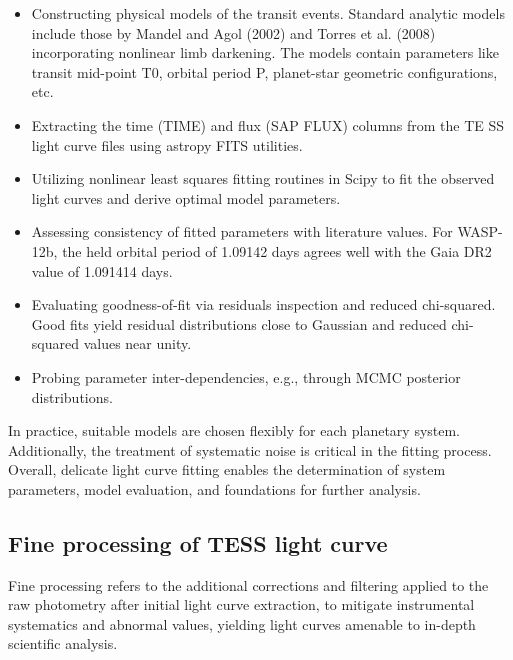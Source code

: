 \documentclass{article}
\begin{document}
\begin{itemize}

    \item Constructing physical models of the transit events. Standard analytic models include those by Mandel and Agol (2002) and Torres et al. (2008) incorporating nonlinear limb darkening. The models contain parameters like transit mid-point T0, orbital period P, planet-star geometric configurations, etc.

    \item Extracting the time (TIME) and flux (SAP FLUX) columns from the TE
    SS light curve files using astropy FITS utilities.

    \item Utilizing nonlinear least squares fitting routines in Scipy to fit the observed light curves and derive optimal model parameters.

    \item Assessing consistency of fitted parameters with literature values. For WASP-12b, the held orbital period of 1.09142 days agrees well with the Gaia DR2 value of 1.091414 days.

    \item Evaluating goodness-of-fit via residuals inspection and reduced chi-squared. Good fits yield residual distributions close to Gaussian and reduced chi-squared values near unity. 
    \item Probing parameter inter-dependencies, e.g., through MCMC posterior distributions.
    
\end{itemize}

In practice, suitable models are chosen flexibly for each planetary system. Additionally, the treatment of systematic noise is critical in the fitting process. Overall, delicate light curve fitting enables the determination of system parameters, model evaluation, and foundations for further analysis.

\subsection{Fine processing of TESS light curve}

Fine processing refers to the additional corrections and filtering applied to the raw photometry after initial light curve extraction, to mitigate instrumental systematics and abnormal values, yielding light curves amenable to in-depth scientific analysis.
\end{document}
